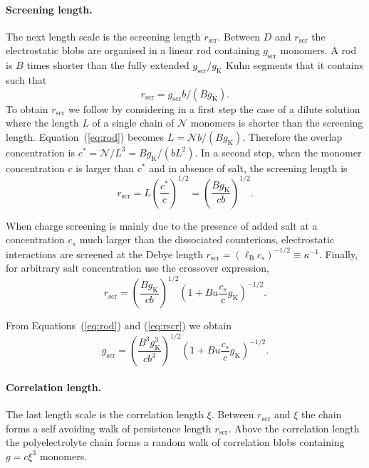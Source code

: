 \documentclass[twoside,twocolumn,9pt]{article}
\begin{document}
\paragraph{Screening length.}
The next length scale is the screening length $r_\mathrm{scr}$. Between $D$ and $r_\mathrm{scr}$ the electrostatic blobs are organised in a linear rod containing $g_\mathrm{scr}$ monomers. A rod is $B$ times shorter than the fully extended $g_\mathrm{scr}/g_\mathrm{K}$ Kuhn segments that it contains such that
\begin{equation}
r_\mathrm{scr}= g_\mathrm{scr} b / (B g_\mathrm{K}).
\label{eq:rod}
\end{equation}
To obtain $r_\mathrm{scr}$ we follow \cite{Dobrynin1995} by considering in a first step the case of a dilute solution where the length $L$ of a single chain of $\mathcal{N}$ monomers is shorter than the screening length. Equation~(\ref{eq:rod}) becomes $L= \mathcal{N} b / (B g_\mathrm{K})$. Therefore the overlap concentration is $c^* = \mathcal{N}/L^3 = B g_\mathrm{K} / (b L^2)$. In a second step, when the monomer concentration $c$ is larger than $c^*$ and in absence of salt, the screening length is
\begin{equation}
r_\mathrm{scr} = L \left(\frac{c^*}{c}\right)^{1/2} =  \left(\frac{B g_\mathrm{K}}{cb}\right)^{1/2}.
\label{eq:rscrNoSalt}
\end{equation}

When charge screening is mainly due to the presence of added salt at a concentration $c_s$ much larger than the dissociated counterions, electrostatic interactions are screened at the Debye length $r_\mathrm{scr} = \left(\ell_\mathrm{B} c_s\right)^{-1/2} \equiv \kappa^{-1}$. Finally, for arbitrary salt concentration \citet{Dobrynin1995} use the crossover expression,
\begin{equation}
r_\mathrm{scr} = \left(\frac{B g_\mathrm{K}}{cb}\right)^{1/2} \left(1+ B u \frac{c_s}{c} g_\mathrm{K}\right)^{-1/2}.
\label{eq:rscr}
\end{equation}

From Equations~(\ref{eq:rod}) and (\ref{eq:rscr}) we obtain
\begin{equation}
g_\mathrm{scr} = \left(\frac{B^3 g_\mathrm{K}^3}{cb^3}\right)^{1/2} \left(1 + B u \frac{c_s}{c} g_\mathrm{K}\right)^{-1/2}.
\label{eq:gscr}
\end{equation}

\paragraph{Correlation length.}
The last length scale is the correlation length $\xi$. Between $r_\mathrm{scr}$ and $\xi$ the chain forms a self avoiding walk of persistence length $r_\mathrm{scr}$. Above the correlation length the polyelectrolyte chain forms a random walk of correlation blobs containing $g=c\xi^3$ monomers.
\end{document}
